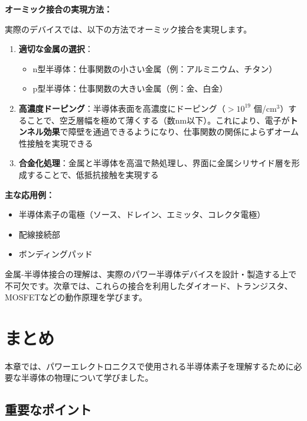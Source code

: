 \textbf{オーミック接合の実現方法：}

実際のデバイスでは、以下の方法でオーミック接合を実現します。

\begin{enumerate}
\item \textbf{適切な金属の選択}：
\begin{itemize}
\item n型半導体：仕事関数の小さい金属（例：アルミニウム、チタン）
\item p型半導体：仕事関数の大きい金属（例：金、白金）
\end{itemize}

\item \textbf{高濃度ドーピング}：半導体表面を高濃度にドーピング（$> 10^{19}$ 個/cm$^3$）することで、空乏層幅を極めて薄くする（数nm以下）。これにより、電子が\textbf{トンネル効果}で障壁を通過できるようになり、仕事関数の関係によらずオーム性接触を実現できる

\item \textbf{合金化処理}：金属と半導体を高温で熱処理し、界面に金属シリサイド層を形成することで、低抵抗接触を実現する
\end{enumerate}

\textbf{主な応用例：}
\begin{itemize}
\item 半導体素子の電極（ソース、ドレイン、エミッタ、コレクタ電極）
\item 配線接続部
\item ボンディングパッド
\end{itemize}

金属-半導体接合の理解は、実際のパワー半導体デバイスを設計・製造する上で不可欠です。次章では、これらの接合を利用したダイオード、トランジスタ、MOSFETなどの動作原理を学びます。


\section{まとめ}

本章では、パワーエレクトロニクスで使用される半導体素子を理解するために必要な半導体の物理について学びました。

\subsection{重要なポイント}

